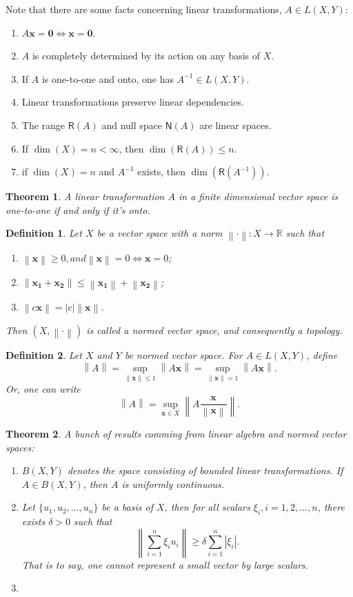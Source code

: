 \documentclass[12pt]{article}
\newtheorem{thm}{Theorem}[section]
\newtheorem{defn}{Definition}[section]
\renewcommand{\vec}[1]{\mathbf{#1}} %
\newcommand{\R}{\mathbb{R}}
\newcommand{\norm}[1]{\left\lVert#1\right\rVert}
\begin{document}
Note that there are some facts concerning linear transformations, $A \in L(X, Y)$:
\begin{enumerate}
	\item $A\textbf{x} = \textbf{0} \iff \textbf{x} = \textbf{0}$.
	\item $A$ is completely determined by its action on any basis of $X$.
	\item If $A$ is one-to-one and onto, one has $A^{-1} \in L(X, Y)$.
	\item Linear transformations preserve linear dependencies.
	\item The range $\mathsf{R}(A)$ and null space $\mathsf{N}(A)$ are linear spaces.
	\item If $\dim(X) = n < \infty$, then $\dim(\mathsf{R}(A)) \leq n$.
	\item if $\dim(X) = n$ and $A^{-1}$ exists, then $\dim(\mathsf{R}(A^{-1}))$.
\end{enumerate}

\begin{thm}
	A linear transformation $A$ in a finite dimensional vector space is one-to-one if and only if it's onto.
\end{thm}

\begin{defn}
	Let $X$ be a vector space with a norm $\norm{\cdot}: X \rightarrow \R$ such that
	\begin{enumerate}
		\item $\norm{\vec{x}} \geq 0, and \norm{\vec{x}} = 0 \iff \vec{x} = 0$;
		\item $\norm{\vec{x_1} + \vec{x_2}} \leq \norm{\vec{x_1}} + \norm{\vec{x_2}}$;
		\item $\norm{c\vec{x}} = |c| \norm{\vec{x}}$.
	\end{enumerate}
	Then $(X, \norm{\cdot})$ is called a normed vector space, and consequently a topology.
\end{defn}

\begin{defn}
	Let $X$ and $Y$ be normed vector space. For $A \in L(X, Y)$, define \[\norm{A} = \sup_{\norm{\vec{x}} \leq 1} \norm{A\vec{x}} = \sup_{\norm{\vec{x}} = 1} \norm{A\vec{x}}.\] Or, one can write \[\norm{A} =  \sup_{\vec{x} \in X} \norm{A\frac{\vec{x}}{\norm{\vec{x}}}}.\]
\end{defn}

\begin{thm}
	A bunch of results comming from linear algebra and normed vector spaces:
	\begin{enumerate}
		\item $B(X, Y)$ denotes the space consisting of bounded linear transformations. If $A \in B(X, Y)$, then $A$ is uniformly continuous.
		\item Let $\{u_1, u_2, \dots, u_n \}$ be a basis of $X$, then for all scalars $\xi_i, i=1,2,\dots, n$, there exists $\delta > 0$ such that \[\norm{\sum_{i = 1}^{n} \xi_i u_i} \geq \delta \sum_{i = 1}^{n}|\xi_i|.\] That is to say, one cannot represent a small vector by large scalars.
		\item 
	\end{enumerate}
\end{thm}
\end{document}
